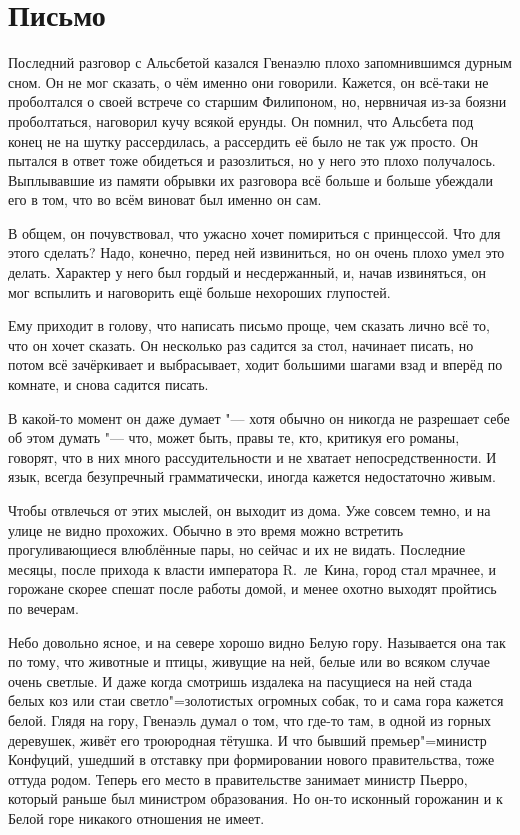 \section{Письмо}

Последний разговор с Альсбетой казался Гвенаэлю плохо запомнившимся дурным сном.
Он не мог сказать, о чём именно они говорили.
Кажется, он всё-таки не проболтался о своей встрече со старшим Филипоном, но,
нервничая из-за боязни проболтаться, наговорил кучу всякой ерунды.
Он помнил, что Альсбета под конец не на шутку рассердилась, а рассердить её было
не так уж просто.
Он пытался в ответ тоже обидеться и разозлиться, но у него это плохо получалось.
Выплывавшие из памяти обрывки их разговора всё больше и больше убеждали его в
том, что во всём виноват был именно он сам.

В общем, он почувствовал, что ужасно хочет помириться с принцессой.
Что для этого сделать?
Надо, конечно, перед ней извиниться, но он очень плохо умел это делать.
Характер у него был гордый и несдержанный, и, начав извиняться, он мог вспылить
и наговорить ещё больше нехороших глупостей.

Ему приходит в голову, что написать письмо проще, чем сказать лично всё то, что
он хочет сказать.
Он несколько раз садится за стол, начинает писать, но потом всё зачёркивает и
выбрасывает, ходит большими шагами взад и вперёд по комнате, и снова садится
писать.

В какой-то момент он даже думает "--- хотя обычно он никогда не разрешает себе
об этом думать "--- что, может быть, правы те, кто, критикуя его романы, говорят,
что в них много рассудительности и не хватает непосредственности.
И язык, всегда безупречный грамматически, иногда кажется недостаточно живым.

Чтобы отвлечься от этих мыслей, он выходит из дома.
Уже совсем темно, и на улице не видно прохожих.
Обычно в это время можно встретить прогуливающиеся влюблённые пары, но сейчас и
их не видать.
Последние месяцы, после прихода к власти императора R.~ле~Кина, город стал
мрачнее, и горожане скорее спешат после работы домой, и менее охотно выходят
пройтись по вечерам.

Небо довольно ясное, и на севере хорошо видно Белую гору.
Называется она так по тому, что животные и птицы, живущие на ней, белые или во
всяком случае очень светлые.
И даже когда смотришь издалека на пасущиеся на ней стада белых коз или стаи
светло"=золотистых огромных собак, то и сама гора кажется белой.
Глядя на гору, Гвенаэль думал о том, что где-то там, в одной из горных деревушек,
живёт его троюродная тётушка.
И что бывший премьер"=министр Конфуций, ушедший в отставку при формировании
нового правительства, тоже оттуда родом.
Теперь его место в правительстве занимает министр Пьерро, который раньше был
министром образования.
Но он-то исконный горожанин и к Белой горе никакого отношения не имеет.

